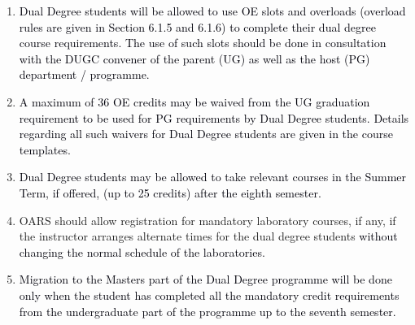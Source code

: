 \documentclass[12pt]{article}
\begin{document}
\vspace{\baselineskip}
\begin{enumerate}
	\item {\fontsize{10pt}{12.0pt}\selectfont \textcolor[HTML]{00000A}{Dual Degree students will be allowed to use OE slots and overloads (overload rules are given in Section 6.1.5 and 6.1.6) to complete their dual degree course requirements. The use of such slots should be done in consultation with the DUGC convener of the parent (UG) as well as the host (PG) department / programme.}\par}\par


\vspace{\baselineskip}
	\item {\fontsize{9pt}{10.8pt}\selectfont \textcolor[HTML]{00000A}{A maximum of 36 OE credits may be waived from the UG graduation requirement to be used for PG requirements by Dual Degree students. Details regarding all such waivers for Dual Degree students are given in the course templates.}\par}\par


\vspace{\baselineskip}
	\item {\fontsize{10pt}{12.0pt}\selectfont \textcolor[HTML]{00000A}{Dual Degree students may be allowed to take relevant courses in the Summer Term, if offered, (up to 25 credits) after the eighth semester.}\par}\par


\vspace{\baselineskip}
	\item {\fontsize{10pt}{12.0pt}\selectfont OARS should allow registration for mandatory laboratory courses, if any, if the instructor arranges alternate times for the dual degree students \textcolor[HTML]{00000A}{without changing the normal schedule of the laboratories.}\par}\par


\vspace{\baselineskip}
	\item {\fontsize{9pt}{10.8pt}\selectfont \textcolor[HTML]{00000A}{Migration to the Masters part of the Dual Degree programme will be done only when the student has completed all the mandatory credit requirements from the undergraduate part of the programme up to the seventh semester.}\par}\par



\end{enumerate}
\end{document}
